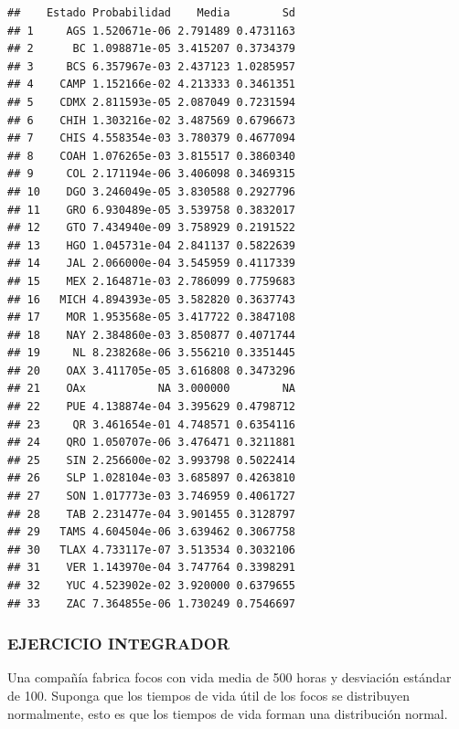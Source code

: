 \documentclass[
]{article}
\begin{document}
\begin{verbatim}
##    Estado Probabilidad    Media        Sd
## 1     AGS 1.520671e-06 2.791489 0.4731163
## 2      BC 1.098871e-05 3.415207 0.3734379
## 3     BCS 6.357967e-03 2.437123 1.0285957
## 4    CAMP 1.152166e-02 4.213333 0.3461351
## 5    CDMX 2.811593e-05 2.087049 0.7231594
## 6    CHIH 1.303216e-02 3.487569 0.6796673
## 7    CHIS 4.558354e-03 3.780379 0.4677094
## 8    COAH 1.076265e-03 3.815517 0.3860340
## 9     COL 2.171194e-06 3.406098 0.3469315
## 10    DGO 3.246049e-05 3.830588 0.2927796
## 11    GRO 6.930489e-05 3.539758 0.3832017
## 12    GTO 7.434940e-09 3.758929 0.2191522
## 13    HGO 1.045731e-04 2.841137 0.5822639
## 14    JAL 2.066000e-04 3.545959 0.4117339
## 15    MEX 2.164871e-03 2.786099 0.7759683
## 16   MICH 4.894393e-05 3.582820 0.3637743
## 17    MOR 1.953568e-05 3.417722 0.3847108
## 18    NAY 2.384860e-03 3.850877 0.4071744
## 19     NL 8.238268e-06 3.556210 0.3351445
## 20    OAX 3.411705e-05 3.616808 0.3473296
## 21    OAx           NA 3.000000        NA
## 22    PUE 4.138874e-04 3.395629 0.4798712
## 23     QR 3.461654e-01 4.748571 0.6354116
## 24    QRO 1.050707e-06 3.476471 0.3211881
## 25    SIN 2.256600e-02 3.993798 0.5022414
## 26    SLP 1.028104e-03 3.685897 0.4263810
## 27    SON 1.017773e-03 3.746959 0.4061727
## 28    TAB 2.231477e-04 3.901455 0.3128797
## 29   TAMS 4.604504e-06 3.639462 0.3067758
## 30   TLAX 4.733117e-07 3.513534 0.3032106
## 31    VER 1.143970e-04 3.747764 0.3398291
## 32    YUC 4.523902e-02 3.920000 0.6379655
## 33    ZAC 7.364855e-06 1.730249 0.7546697
\end{verbatim}

\subsubsection{EJERCICIO INTEGRADOR}\label{ejercicio-integrador}

Una compañía fabrica focos con vida media de 500 horas y desviación
estándar de 100. Suponga que los tiempos de vida útil de los focos se
distribuyen normalmente, esto es que los tiempos de vida forman una
distribución normal.
\end{document}
